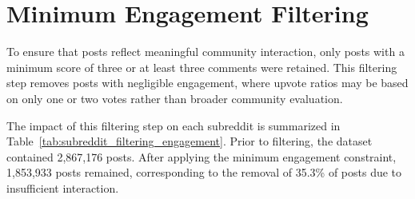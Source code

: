 \section{Minimum Engagement Filtering}
\label{sec:minimum_engagement_constraint}

To ensure that posts reflect meaningful community interaction, only posts with a minimum score of three or at least three comments were retained. This filtering step removes posts with negligible engagement, where upvote ratios may be based on only one or two votes rather than broader community evaluation.

The impact of this filtering step on each subreddit is summarized in Table~\ref{tab:subreddit_filtering_engagement}. Prior to filtering, the dataset contained 2,867,176 posts. After applying the minimum engagement constraint, 1,853,933 posts remained, corresponding to the removal of 35.3\% of posts due to insufficient interaction.


